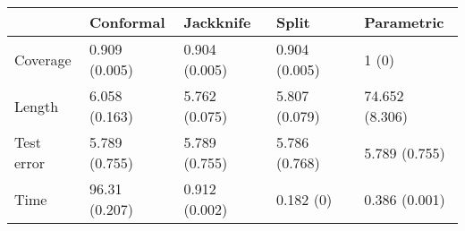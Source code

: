 \begin{tabular}{|l|l|l|l|l|}
\hline
& Conformal & Jackknife & Split & Parametric \\
\hline
Coverage & 0.909 (0.005) & 0.904 (0.005) & 0.904 (0.005) & 1 (0) \\
\hline
Length & 6.058 (0.163) & 5.762 (0.075) & 5.807 (0.079) & 74.652 (8.306) \\
\hline
Test error & 5.789 (0.755) & 5.789 (0.755) & 5.786 (0.768) & 5.789 (0.755) \\
\hline
Time & 96.31 (0.207) & 0.912 (0.002) & 0.182 (0) & 0.386 (0.001) \\
\hline
\end{tabular}
